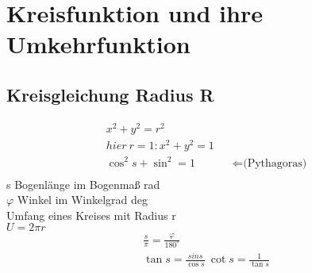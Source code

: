 \documentclass[14pt,a4paper]{extarticle}
\begin{document}
	\section{Kreisfunktion und ihre Umkehrfunktion}
	
	\subsection{Kreisgleichung Radius R}
	\begin{align*}
		x^2+y^2=r^2 \\
		hier \ r=1 : x^2+y^2 = 1 \\
		\cos ^2 s + \sin ^2 = 1 && \Leftarrow \text{(Pythagoras)} \\
	\end{align*}
	s Bogenlänge im Bogenmaß rad \\
	\begin{math} \varphi \end{math} Winkel im Winkelgrad deg \begin{math} [^\circ] \end{math} \\
	Umfang eines Kreises mit Radius r \\
	\begin{math}U = 2\pi r\end{math}
	\begin{eqnarray}
	\frac{s}{\pi}=\frac{\varphi}{180^\circ} \\
	\tan s=\frac{sin s}{\cos s} \ \cot s =\frac{1}{\tan s}
	\end{eqnarray}	
	
\end{document}
